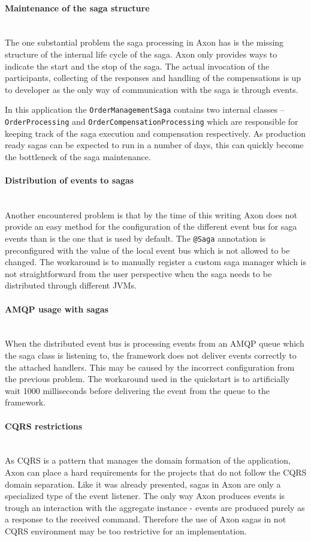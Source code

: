 \documentclass[oneside,
  digital, %
  table,   %
  nolof,     %
  nolot,     %
]{fithesis3}
\newcommand{\newlinepar}[1]{\paragraph{#1}\needspace{4\baselineskip}\mbox{}\\}
\begin{document}
\newlinepar{Maintenance of the saga structure}

The one substantial problem the saga processing in Axon has is the missing structure of the internal life cycle of the saga. Axon only provides ways to indicate the start and the stop of the saga. The actual invocation of the participants, collecting of the responses and handling of the compensations is up to developer as the only way of communication with the saga is through events.

In this application the \texttt{OrderManagementSaga} contains two internal classes -- \texttt{OrderProcessing} and \texttt{OrderCompensationProcessing} which are responsible for keeping track of the saga execution and compensation respectively. As production ready sagas can be expected to run in a number of days, this can quickly become the bottleneck of the saga maintenance.

\newlinepar{Distribution of events to sagas}

Another encountered problem is that by the time of this writing Axon does not provide an easy method for the configuration of the different event bus for saga events than is the one that is used by default. The \texttt{@Saga} annotation is preconfigured with the value of the local event bus which is not allowed to be changed. The workaround is to manually register a custom saga manager which is not straightforward from the user perspective when the saga needs to be distributed through different JVMs.

\newlinepar{AMQP usage with sagas}

When the distributed event bus is processing events from an AMQP queue which the saga class is listening to, the framework does not deliver events correctly to the attached handlers. This may be caused by the incorrect configuration from the previous problem. The workaround used in the quickstart is to artificially wait 1000 milliseconds before delivering the event from the queue to the framework.

\newlinepar{CQRS restrictions}

As CQRS is a pattern that manages the domain formation of the application, Axon can place a hard requirements for the projects that do not follow the CQRS domain separation. Like it was already presented, sagas in Axon are only a specialized type of the event listener. The only way Axon produces events is trough an interaction with the aggregate instance - events are produced purely as a response to the received command. Therefore the use of Axon sagas in not CQRS environment may be too restrictive for an implementation.
\end{document}
